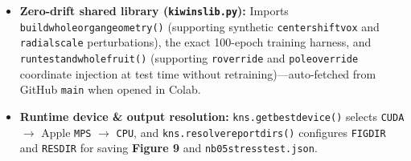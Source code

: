 \documentclass[10pt,a4paper]{article}
\renewcommand{\_}{\origunderscore\allowbreak}
\begin{document}
\begin{itemize}
\item \textbf{Zero-drift shared library (\texttt{kiwi\_ns\_lib.py}):} Imports \texttt{build\_whole\_organ\_geometry()} (supporting synthetic \texttt{center\_shift\_vox} and \texttt{radial\_scale} perturbations), the exact 100-epoch training harness, and \texttt{run\_test\_and\_whole\_fruit()} (supporting \texttt{r\_override} and \texttt{pole\_override} coordinate injection at test time without retraining)---auto-fetched from GitHub \texttt{main} when opened in Colab.
\item \textbf{Runtime device \& output resolution:} \texttt{kns.get\_best\_device()} selects \texttt{CUDA} $\to$ Apple \texttt{MPS} $\to$ \texttt{CPU}, and \texttt{kns.resolve\_report\_dirs()} configures \texttt{FIG\_DIR} and \texttt{RES\_DIR} for saving \textbf{Figure 9} and \texttt{nb05\_stress\_test.json}.
\end{itemize}
\end{document}
